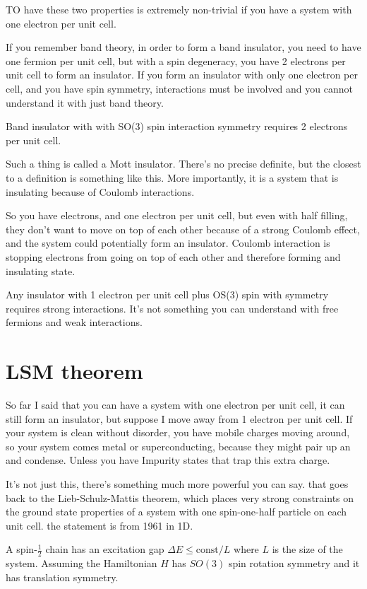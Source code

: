 TO have these two properties is extremely non-trivial if you have a system with
one electron per unit cell.

If you remember band theory,
in order to form a band insulator,
you need to have one fermion per unit cell,
but with a spin degeneracy,
you have 2 electrons per unit cell
to form an insulator.
If you form an insulator with only one electron per cell,
and you have spin symmetry,
interactions must be involved and you cannot understand it with just band
theory.

Band insulator with with SO(3) spin interaction symmetry requires 2 electrons
per unit cell.

Such a thing is called a Mott insulator.
There's no precise definite,
but the closest to a definition is something like this.
More importantly,
it is a system that is insulating because of Coulomb interactions.

So you have electrons,
and one electron per unit cell,
but even with half filling,
they don't want to move on top of each other because of a strong Coulomb effect,
and the system could potentially form an insulator.
Coulomb interaction is stopping electrons from going on top of each other and
therefore forming and insulating state.

Any insulator with 1 electron per unit cell plus OS(3) spin with symmetry
requires strong interactions.
It's not something you can understand with free fermions and weak interactions.

\section{LSM theorem}
So far I said that you can have a system with one electron per unit cell,
it can still form an insulator,
but suppose I move away from 1 electron per unit cell.
If your system is clean without disorder,
you have mobile charges moving around,
so your system comes metal or superconducting,
because they might pair up an and condense.
Unless you have Impurity states that trap this extra charge.

It's not just this,
there's something much more powerful you can say.
that goes back to the Lieb-Schulz-Mattis theorem,
which places very strong constraints on the ground state properties of a system
with one spin-one-half particle on each unit cell.
the statement is from 1961 in 1D.

A spin-$\frac{1}{2}$ chain has an excitation gap $\Delta E \le \mathrm{const}/L$
where $L$ is the size of the system.
Assuming the Hamiltonian $H$ has $SO(3)$ spin rotation symmetry
and it has translation symmetry.

